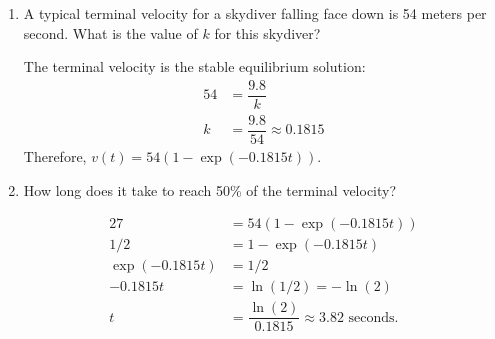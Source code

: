 \begin{enumerate}[leftmargin=0pt]
\begin{enumerate}
    \begin{red}
        This equation is separable. First I'll factor out $k$.
        \begin{align*}
            \dfrac{dv}{dt} &= 9.8 - k\cdot v = k \cdot \left(\dfrac{9.8}{k} - v\right)\\
            \dfrac{1}{9.8/k - v} \ dv &= k\ dt \\
            \int \dfrac{1}{9.8/k - v} \ dv &= \int k\ dt \\
            -\ln\left(\dfrac{9.8}{k} - v\right) &= kt + C \\
            \dfrac{9.8}{k} - v &= C\cdot \exp(-kt) \\
            v(t) &= \dfrac{9.8}{k} - C\cdot \exp(-kt) \\
            0 = v(0) &= \dfrac{9.8}{k} - C\cdot \exp(-k\cdot 0) \\
            C &= \dfrac{9.8}{k} \\
            v(t) &= \dfrac{9.8}{k}\left(1 - \exp(-k\cdot t)\right)
        \end{align*}
    \end{red}
    \item A typical terminal velocity for a skydiver falling face down is 54 meters per second. What is the value of $k$ for this skydiver?

    \begin{red}
        The terminal velocity is the stable equilibrium solution:
        \begin{align*}
            54 &= \dfrac{9.8}{k} \\
            k &= \dfrac{9.8}{54} \approx 0.1815
        \end{align*}
        Therefore, $v(t) = 54(1-\exp(-0.1815 t)).$
    \end{red}
    \item How long does it take to reach 50\% of the terminal velocity?
    \begin{red}
        \begin{align*}
            27 &= 54(1-\exp(-0.1815 t)) \\
            1/2 &= 1-\exp(-0.1815 t) \\
            \exp(-0.1815 t) &= 1/2 \\
            -0.1815 t &= \ln(1/2) = -\ln(2) \\
            t &= \dfrac{\ln(2)}{0.1815} \approx 3.82\text{ seconds}.
        \end{align*}
    \end{red}
\end{enumerate}


\end{enumerate}
